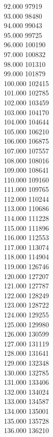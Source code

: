 { 92.000	97919 \\
 93.000	98480 \\
 94.000	99043 \\
 95.000	99725 \\
 96.000	100190 \\
 97.000	100832 \\
 98.000	101310 \\
 99.000	101879 \\
 100.000	102415 \\
 101.000	102785 \\
 102.000	103459 \\
 103.000	104170 \\
 104.000	104644 \\
 105.000	106210 \\
 106.000	106875 \\
 107.000	107557 \\
 108.000	108016 \\
 109.000	108641 \\
 110.000	109160 \\
 111.000	109765 \\
 112.000	110244 \\
 113.000	110686 \\
 114.000	111228 \\
 115.000	111896 \\
 116.000	112553 \\
 117.000	113074 \\
 118.000	114904 \\
 119.000	126746 \\
 120.000	127207 \\
 121.000	127787 \\
 122.000	128249 \\
 123.000	128722 \\
 124.000	129255 \\
 125.000	129980 \\
 126.000	130599 \\
 127.000	131119 \\
 128.000	131641 \\
 129.000	132348 \\
 130.000	132785 \\
 131.000	133406 \\
 132.000	134024 \\
 133.000	134587 \\
 134.000	135001 \\
 135.000	135728 \\
 136.000	136210 \\
}
